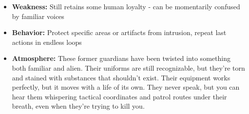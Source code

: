 \documentclass[11pt]{article}
\begin{document}
\begin{itemize}
\begin{itemize}
\begin{itemize}
    \end{itemize}
  \item \textbf{Weakness:} Still retains some human loyalty - can be momentarily confused by familiar voices
  \item \textbf{Behavior:} Protect specific areas or artifacts from intrusion, repeat last actions in endless loops
  \item \textbf{Atmosphere:} These former guardians have been twisted into something both familiar and alien. Their uniforms are still recognizable, but they're torn and stained with substances that shouldn't exist. Their equipment works perfectly, but it moves with a life of its own. They never speak, but you can hear them whispering tactical coordinates and patrol routes under their breath, even when they're trying to kill you.
  \end{itemize}
\end{itemize}
\end{document}
